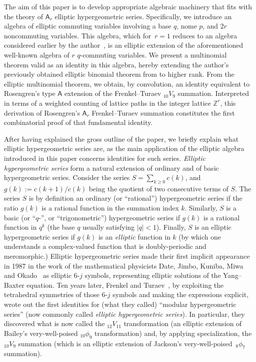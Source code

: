 \documentclass[10pt,a4paper]{amsart}
\numberwithin{equation}{section}
\theoremstyle{definition}
\begin{document}
The aim of this paper is to develop appropriate algebraic machinery
that fits with the theory of $\mathsf A_r$ elliptic hypergeometric series.
Specifically, we introduce an algebra of elliptic commuting variables
involving a base $q$, nome $p$, and $2r$ noncommuting
variables. This algebra, which for~${r=1}$
reduces to an algebra considered earlier by the author~\cite{S1},
is an elliptic extension of the aforementioned well-known
algebra of $r$ $q$-commuting variables. We present
a multinomial theorem valid as an identity in this algebra,
hereby extending the author's previously obtained elliptic
binomial theorem from \cite{S1} to higher rank.
From the elliptic multinomial theorem, we obtain, by convolution,
an identity equivalent to Rosengren's type $\mathsf A$ extension
of the Frenkel--Turaev ${}_{10}V_9$ summation.
Interpreted in terms of a weighted counting of lattice paths
in the integer lattice $\mathbb Z^r$, this derivation of Rosengren's
$\mathsf A_r$ Frenkel--Turaev summation constitutes
the first combinatorial proof of that fundamental identity.

After having explained the gross outline of the paper, we
briefly explain what elliptic hypergeometric series are,
as the main application of the elliptic algebra introduced
in this paper concerns identities for such series.
\textit{Elliptic hypergeometric series} form a
natural extension of
ordinary and of basic hypergeometric series.
Consider the series
$S=\sum_{k\ge 0}c(k)$, and~${g(k):=c(k+1)/c(k)}$
being the quotient of two consecutive terms of $S$.
The series $S$ is by definition an ordinary (or ``rational'')
hypergeometric series if the ratio $g(k)$ is a rational
function in the summation index $k$. Similarly, $S$ is a
basic (or ``$q$-'', or ``trigonometric'') hypergeometric
series if $g(k)$ is a rational function in $q^k$ (the base
$q$ usually satisfying $|q|<1$). Finally, $S$ is an elliptic
hypergeometric series if $g(k)$ is an \textit{elliptic}
function in $k$ (by which one understands a
complex-valued function that is doubly-periodic and
meromorphic.) Elliptic hypergeometric series made
their first implicit appearance in 1987 in the work of
the mathematical physicists Date, Jimbo, Kuniba, Miwa
and Okado~\cite{DJKMO} as elliptic $6$-$j$ symbols,
representing elliptic solutions of the Yang--Baxter equation.
Ten years later, Frenkel and Turaev~\cite{FT}, by exploiting the
tetrahedral symmetries of those $6$-$j$ symbols and making the
expressions explicit, wrote out the first identities for (what they called)
``modular hypergeometric series'' (now commonly called
\textit{elliptic hypergeometric series}). In particular, they discovered
what is now called the ${}_{12}V_{11}$
transformation (an elliptic extension of Bailey's very-well-poised
${}_{10}\phi_9$ transformation) and, by applying specialization,
the ${}_{10}V_9$ summation (which is an elliptic extension of
Jackson's very-well-poised~${}_8\phi_7$ summation).
\end{document}

